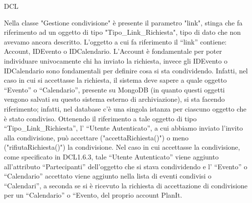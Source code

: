 \begin{listaPersonale}{DCL}
        
    Nella classe "Gestione condivisione" è presente il parametro "link", stinga che fa riferimento ad un oggetto di tipo "Tipo\_Link\_Richiesta", tipo di dato che non avevamo ancora descritto.
    L’oggetto a cui fa riferimento il “link” contiene: Account, IDEvento o IDCalendario. L’Account è fondamentale per poter individuare univocamente chi ha inviato la richiesta, invece gli IDEvento o IDCalendario sono fondamentali per definire cosa si sta condividendo. Infatti, nel caso in cui si accettasse la richiesta, il sistema deve sapere a quale oggetto “Evento” o “Calendario”, presente su MongoDB (in quanto questi oggetti vengono salvati su questo sistema esterno di archiviazione), si sta facendo riferimento; infatti, nel database c’è una singola istanza per ciascuno oggetto che è stato condiviso.
    Ottenendo il riferimento a tale oggetto di tipo “Tipo\_Link\_Richiesta”, l’ “Utente Autenticato”, a cui abbiamo inviato l’invito alla condivisione, può accettare ("accettaRichiesta()") o meno ("rifiutaRichiesta()") la condivisione. Nel caso in cui accettasse la condivisione, come specificato in DCL1.6.3, tale “Utente Autenticato” viene aggiunto all’attributo “Partecipanti” dell’oggetto che si stava condividendo e l’ “Evento” o “Calendario” accettato viene aggiunto nella lista di eventi condivisi o “Calendari”, a seconda se si è ricevuto la richiesta di accettazione di condivisione per un “Calendario” o “Evento, del proprio account PlanIt.
    
    
        \begin{center}
            
        \end{center}
    
        

\end{listaPersonale}